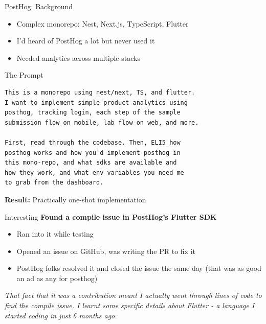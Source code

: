 \documentclass{beamer}
\begin{document}
\begin{frame}{PostHog: Background}
    \pause
    \begin{itemize}[<+->]
        \item Complex monorepo: Nest, Next.js, TypeScript, Flutter
        \item I'd heard of PostHog a lot but never used it
        \item Needed analytics across multiple stacks
    \end{itemize}
\end{frame}

\begin{frame}[fragile]{The Prompt}
    \small
    \begin{lstlisting}
This is a monorepo using nest/next, TS, and flutter.
I want to implement simple product analytics using
posthog, tracking login, each step of the sample 
submission flow on mobile, lab flow on web, and more.

First, read through the codebase. Then, ELI5 how
posthog works and how you'd implement posthog in
this mono-repo, and what sdks are available and
how they work, and what env variables you need me
to grab from the dashboard.
    \end{lstlisting}

    \vspace{0.5em}
    \normalsize
    \textbf{Result:} Practically one-shot implementation
\end{frame}

\begin{frame}{Interesting}
    \textbf{Found a compile issue in PostHog's Flutter SDK}

    \vspace{1em}
    \begin{itemize}[<+->]
        \item Ran into it while testing
        \item Opened an issue on GitHub, was writing the PR to fix it
        \item PostHog folks resolved it and closed the issue the same day (that was as good an ad as any for posthog)
    \end{itemize}

    \vspace{1em}
    \onslide<+->
    \textit{That fact that it was a contribution meant I actually went through lines of code to find the compile issue. I learnt some specific details about Flutter - a language I started coding in just 6 months ago.}
\end{frame}
\end{document}
